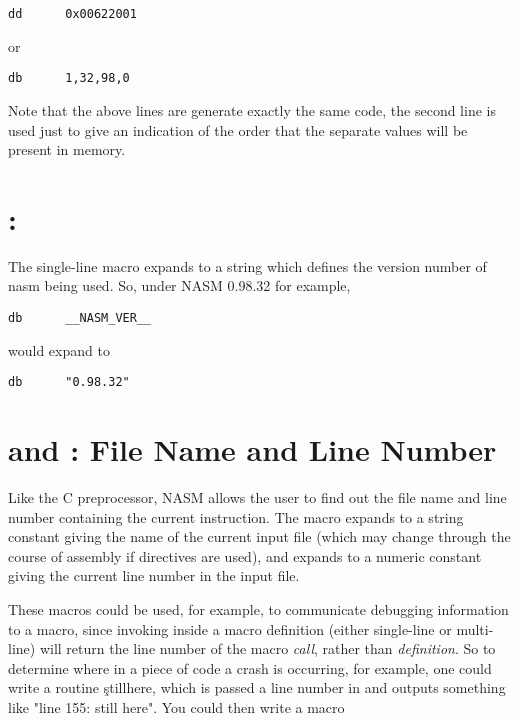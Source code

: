\begin{lstlisting}
dd      0x00622001
\end{lstlisting}

or

\begin{lstlisting}
db      1,32,98,0
\end{lstlisting}

Note that the above lines are generate exactly the same code, the second
line is used just to give an indication of the order that the separate
values will be present in memory.


\section{: }
\label{sec:stdmacverstr}

The single-line macro  expands to a string which defines
the version number of nasm being used. So, under NASM 0.98.32 for example,

\begin{lstlisting}
db      __NASM_VER__
\end{lstlisting}

would expand to

\begin{lstlisting}
db      "0.98.32"
\end{lstlisting}

\section{ and : File Name and Line Number}
\label{sec:fileline}

Like the C preprocessor, NASM allows the user to find out the file
name and line number containing the current instruction. The macro
 expands to a string constant giving the name of the
current input file (which may change through the course of assembly
if  directives are used), and  expands
to a numeric constant giving the current line number in the input file.

These macros could be used, for example, to communicate debugging
information to a macro, since invoking  inside a macro
definition (either single-line or multi-line) will return the line
number of the macro \emph{call}, rather than \emph{definition}. So to
determine where in a piece of code a crash is occurring, for example,
one could write a routine \c{stillhere}, which is passed a line number
in  and outputs something like "line 155: still here".
You could then write a macro

